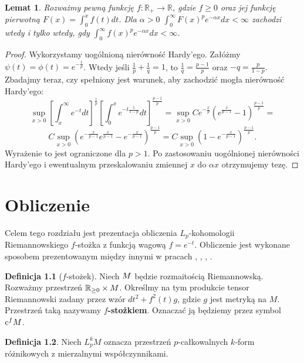 \documentclass[licencjacka]{pracamgr}
\theoremstyle{definition}
\newtheorem{definition}{Definicja}[section]
\theoremstyle{definition}
\theoremstyle{plain}
\newtheorem{lemma}{Lemat}[section]
\theoremstyle{plain}
\theoremstyle{plain}
\theoremstyle{plain}
\def\cfm{\ensuremath\mathrm{c}^fM}
\def\M{\ensuremath M}
\begin{document}
\begin{lemma}
Rozważmy pewną funkcję $f: \mathbb{R}_{+} \rightarrow \mathbb{R}$, gdzie $f
\geq 0$ oraz jej funkcję pierwotną $F(x) = \int_0^{x} f(t) dt$. Dla $\alpha > 0$ 
 $\int_0^\infty F(x)^pe^{- \alpha x}dx < \infty$
zachodzi wtedy i tylko wtedy, gdy
$\int_0^\infty f(x)^p e^{-\alpha x}dx < \infty$.
\end{lemma}
\begin{proof}
Wykorzystamy uogólnioną nierówność Hardy'ego.  Załóżmy $\psi(t) = \phi(t) =
e^{- \frac{t}{p} }$. Wtedy jeśli $\frac{1}{p} + \frac{1}{q} = 1 $, to
$\frac{1}{q} = \frac{p-1}{p}$ oraz $-q = \frac{p}{1-p}$.  Zbadajmy teraz, czy
spełniony jest warunek, aby zachodzić mogła nierówność Hardy'ego:
$$
\sup_{x > 0}
\left[
\int_x^\infty  
    e^{-t} dt
\right]^{\frac{1}{p}}
\left[
\int_0^x
    e^{-t \frac{1}{1-p}} dt
\right]^{\frac{p-1}{p}}
=
\sup_{x > 0}
    C
    e^{- \frac{x}{p}}
    \left(
        e^{\frac{x}{p-1}} - 1
    \right)^{\frac{p-1}{p}}
=
$$
$$
C
\sup_{x > 0}
    \left(
    e^{- \frac{x}{p-1}}
        e^{\frac{x}{p-1}} -
    e^{- \frac{x}{p-1}}
    \right)^{\frac{p-1}{p}}
=
C
\sup_{x > 0}
    \left(
        1 -
    e^{- \frac{x}{p-1}}
    \right)^{\frac{p-1}{p}}. 
$$
Wyrażenie to jest ograniczone dla $p> 1$. Po zastosowaniu uogólnionej
nierówności Hardy'ego i ewentualnym przeskalowaniu zmiennej $x$ do $\alpha x$
otrzymujemy tezę.
\end{proof}


\chapter{Obliczenie}

Celem tego rozdziału jest prezentacja obliczenia 
$L_p$-kohomologii Riemannowskiego $f$-stożka z funkcją wagową $f = e^{-t}$.
Obliczenie jest wykonane sposobem prezentowanym między innymi w
pracach \cite{cheeger}, \cite{youssin}, \cite{kirwan}, \cite{weber}.

\begin{definition}[$f$-stożek]
    Niech $\M$ będzie rozmaitością Riemannowską. Rozważmy przestrzeń
    $\mathbb{R}_{\geq 0} \times \M$. Określmy na tym produkcie tensor
    Riemannowski zadany przez wzór $dt^2 + f^{2}(t)g $, gdzie $g$ jest
    metryką na $M$.  Przestrzeń taką nazywamy \textbf{$f$-stożkiem}.
    Oznaczać ją będziemy przez symbol $\cfm$.
\end{definition}

\begin{definition}
  Niech $L_p^k M$ oznacza przestrzeń $p$-całkowalnych 
  $k$-form różnikowych z mierzalnymi  współczynnikami.
\end{definition}
\end{document}
